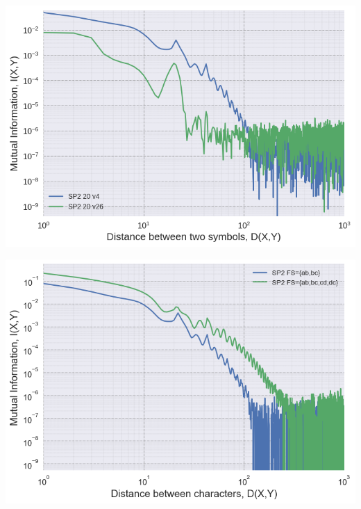 \documentclass[a0,portrait]{a0poster}
\begin{document}
\begin{multicols}{2}
\begin{center}
\begin{minipage}[b]{0.4\linewidth}
\centering
\includegraphics[width=\textwidth]{spk_v.png}
\label{fig:spk_v}
\end{minipage}
\hspace{0.5cm}
\begin{minipage}[b]{0.4\linewidth}
\centering
\includegraphics[width=\textwidth]{spk_f.png}
\label{fig:spk_f}
\end{minipage}
\end{center}


\end{multicols}
\end{document}
